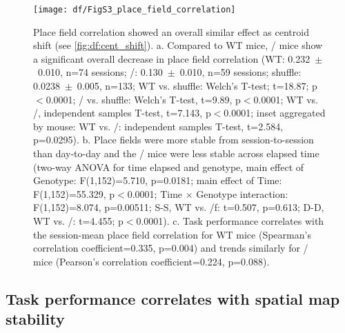 \begin{figure}
	\centering
	\texttt{[image: df/FigS3\_place\_field\_correlation]}
	\caption[Comparison of place field correlation]{Place field correlation showed an overall similar effect as centroid shift (see \autoref{fig:df:cent_shift}). a. Compared to WT mice, \df/ mice show a significant overall decrease in place field correlation (WT: 0.232~$\pm$~0.010, n=74 sessions; \df/: 0.130~$\pm$~0.010, n=59 sessions; shuffle: 0.0238~$\pm$~0.005, n=133; WT vs. shuffle: Welch's T-test; t=18.87; p$<$0.0001; \df/ vs. shuffle: Welch's T-test, t=9.89, p$<$0.0001; WT vs. \df/, independent samples T-test, t=7.143, p$<$0.0001; inset aggregated by mouse: WT vs. \df/: independent samples T-test, t=2.584, p=0.0295). b. Place fields were more stable from session-to-session than day-to-day and the \df/ mice were less stable across elapsed time (two-way ANOVA for time elapsed and genotype, main effect of Genotype: F(1,152)=5.710, p=0.0181; main effect of Time: F(1,152)=55.329, p$<$0.0001; Time $\times$ Genotype interaction: F(1,152)=8.074, p=0.00511; S-S, WT vs. \df/f: t=0.507, p=0.613; D-D, WT vs. \df/: t=4.455; p$<$0.0001). c. Task performance correlates with the session-mean place field correlation for WT mice (Spearman's correlation coefficient=0.335, p=0.004) and trends similarly for \df/ mice (Pearson's correlation coefficient=0.224, p=0.088).}
	\label{fig:df:pf_corr}
\end{figure}

\subsection{Task performance correlates with spatial map stability}

